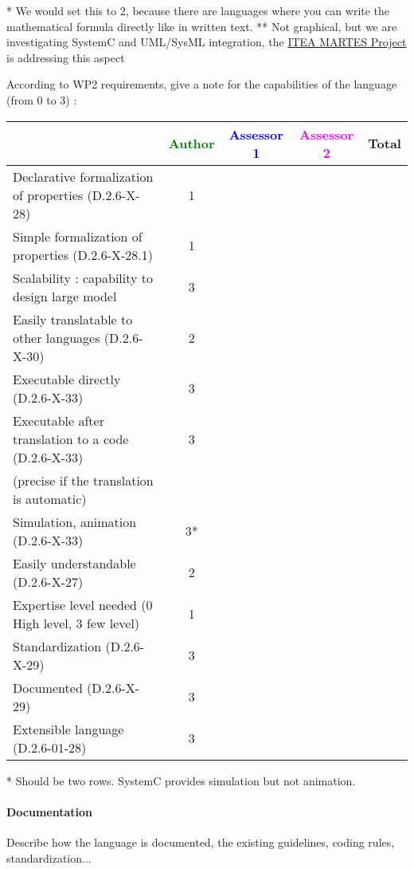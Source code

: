 \begin{author_comment}
* We would set this to 2, because there are languages where you can write the mathematical formula directly like in written text.
** Not graphical, but we are investigating SystemC and UML/SysML integration, the \href{http://www.martes-idea.org/}{ITEA MARTES Project} is addressing this aspect
\end{author_comment}

According to WP2 requirements, give a note for the capabilities of the language (from 0 to 3) :

\begin{tabular}{|l | c | c | c | c|}
\hline
& \textcolor{green}{Author} & \textcolor{blue}{Assessor 1} & \textcolor{magenta}{Assessor 2} & Total \\
\hline
Declarative formalization of properties (D.2.6-X-28) &1 & & & \\
\hline
Simple formalization of properties (D.2.6-X-28.1) &1 & & & \\
\hline
Scalability : capability to design large model &3 & & & \\
\hline
Easily translatable to other languages (D.2.6-X-30) &2 & & & \\
\hline
Executable directly (D.2.6-X-33) &3 & & & \\
\hline
Executable after translation to a code (D.2.6-X-33) &3 & & & \\
(precise if the translation is automatic) & & & & \\
\hline
Simulation, animation (D.2.6-X-33) &3* & & & \\
\hline
Easily understandable (D.2.6-X-27) &2 & & & \\
\hline
Expertise level needed (0 High level, 3 few level) &1 & & & \\
\hline
Standardization (D.2.6-X-29) &3 & & & \\
\hline
Documented (D.2.6-X-29) &3 & & & \\
\hline
Extensible language (D.2.6-01-28) &3 & & & \\
\hline
\end{tabular}

\begin{author_comment}
* Should be two rows. SystemC provides simulation but not animation.
\end{author_comment}


\paragraph{Documentation} Describe how the language is documented, the existing guidelines, coding rules, standardization...

